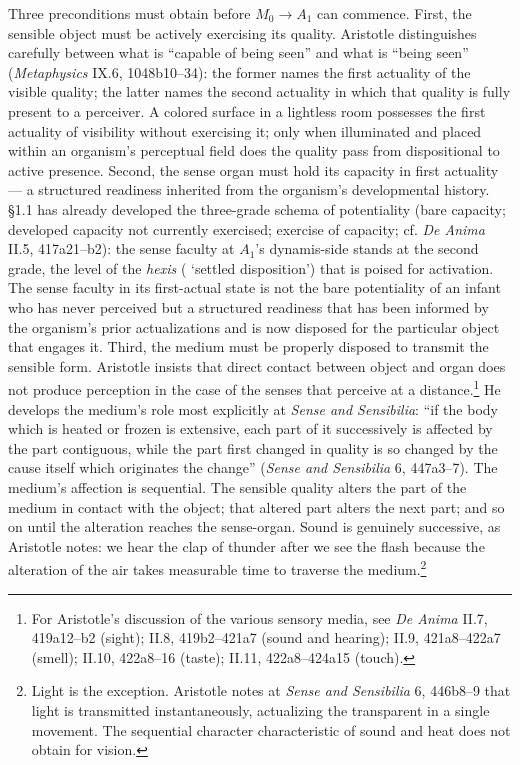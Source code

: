 Three preconditions must obtain before $M_0 \rightarrow A_1$ can commence. First, the sensible object must be actively exercising its quality. Aristotle distinguishes carefully between what is ``capable of being seen'' and what is ``being seen'' (\textit{Metaphysics} IX.6, 1048b10--34): the former names the first actuality of the visible quality; the latter names the second actuality in which that quality is fully present to a perceiver. A colored surface in a lightless room possesses the first actuality of visibility without exercising it; only when illuminated and placed within an organism's perceptual field does the quality pass from dispositional to active presence. Second, the sense organ must hold its capacity in first actuality --- a structured readiness inherited from the organism's developmental history. §1.1 has already developed the three-grade schema of potentiality (bare capacity; developed capacity not currently exercised; exercise of capacity; cf. \textit{De Anima} II.5, 417a21--b2): the sense faculty at $A_1$'s dynamis-side stands at the second grade, the level of the \textit{hexis} ( `settled disposition') that is poised for activation. The sense faculty in its first-actual state is not the bare potentiality of an infant who has never perceived but a structured readiness that has been informed by the organism's prior actualizations and is now disposed for the particular object that engages it. Third, the medium must be properly disposed to transmit the sensible form. Aristotle insists that direct contact between object and organ does not produce perception in the case of the senses that perceive at a distance.\footnote{For Aristotle's discussion of the various sensory media, see \textit{De Anima} II.7, 419a12--b2 (sight); II.8, 419b2--421a7 (sound and hearing); II.9, 421a8--422a7 (smell); II.10, 422a8--16 (taste); II.11, 422a8--424a15 (touch).} He develops the medium's role most explicitly at \textit{Sense and Sensibilia}: ``if the body which is heated or frozen is extensive, each part of it successively is affected by the part contiguous, while the part first changed in quality is so changed by the cause itself which originates the change'' (\textit{Sense and Sensibilia} 6, 447a3--7). The medium's affection is sequential. The sensible quality alters the part of the medium in contact with the object; that altered part alters the next part; and so on until the alteration reaches the sense-organ. Sound is genuinely successive, as Aristotle notes: we hear the clap of thunder after we see the flash because the alteration of the air takes measurable time to traverse the medium.\footnote{Light is the exception. Aristotle notes at \textit{Sense and Sensibilia} 6, 446b8--9 that light is transmitted instantaneously, actualizing the transparent in a single movement. The sequential character characteristic of sound and heat does not obtain for vision.}

